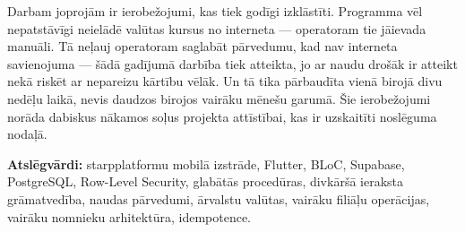 Darbam joprojām ir ierobežojumi, kas tiek godīgi izklāstīti. Programma vēl nepatstāvīgi neielādē valūtas kursus no interneta --- operatoram tie jāievada manuāli. Tā neļauj operatoram saglabāt pārvedumu, kad nav interneta savienojuma --- šādā gadījumā darbība tiek atteikta, jo ar naudu drošāk ir atteikt nekā riskēt ar nepareizu kārtību vēlāk. Un tā tika pārbaudīta vienā birojā divu nedēļu laikā, nevis daudzos birojos vairāku mēnešu garumā. Šie ierobežojumi norāda dabiskus nākamos soļus projekta attīstībai, kas ir uzskaitīti noslēguma nodaļā.

\thesisscopeLV

\textbf{Atslēgvārdi:} starpplatformu mobilā izstrāde, Flutter, BLoC, Supabase, PostgreSQL, Row-Level Security, glabātās procedūras, divkāršā ieraksta grāmatvedība, naudas pārvedumi, ārvalstu valūtas, vairāku filiāļu operācijas, vairāku nomnieku arhitektūra, idempotence.
